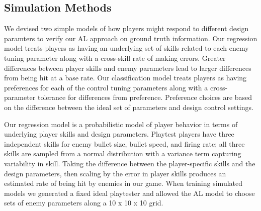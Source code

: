 \documentclass{sig-alternate}
\begin{document}
%

%

\subsection{Simulation Methods}
We devised two simple models of how players might respond to different design paramters to verify our AL approach on ground truth information.
Our regression model treats players as having an underlying set of skills related to each enemy tuning parameter along with a cross-skill rate of making errors.
Greater differences between player skills and enemy parameters lead to larger differences from being hit at a base rate.
Our classification model treats players as having preferences for each of the control tuning parameters along with a cross-parameter tolerance for differences from preference.
Preference choices are based on the difference between the ideal set of parameters and design control settings.




Our regression model is a probabilistic model of player behavior in terms of underlying player skills and design parameters.
Playtest players have three independent skills for enemy bullet size, bullet speed, and firing rate; all three skills are sampled from a normal distribution with a variance term capturing variability in skill.
Taking the difference between the player-specific skills and the design parameters, then scaling by the error in player skills produces an estimated rate of being hit by enemies in our game.
When training simulated models we generated a fixed ideal playtester and allowed the AL model to choose sets of enemy parameters along a 10 x 10 x 10 grid.
\end{document}
